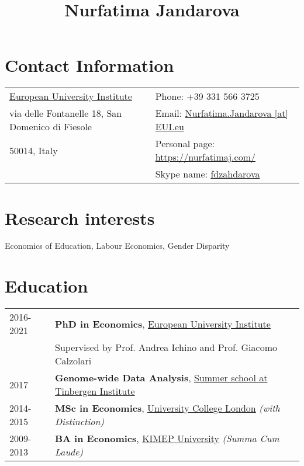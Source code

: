 \documentclass[a4, 11pt]{article}
\title{ {\Huge  Nurfatima Jandarova} }
\date{}
\begin{document}
    \maketitle


    \section*{Contact Information}
    \begin{table}[H]
      \begin{tabular}{ll}\href{https://www.eui.eu/}{European University Institute}&Phone: +39 331 566 3725\\
        via delle Fontanelle 18, San Domenico di Fiesole&
        Email: \href{mailto:Nurfatima.Jandarova [at] EUI.eu}{Nurfatima.Jandarova [at] EUI.eu} \\
        50014, Italy& Personal page: \href{https://nurfatimaj.com/}{https://nurfatimaj.com/} \\
        & Skype name: \href{skype:fdzahdarova?call}{fdzahdarova}
      \end{tabular}
    \end{table}

    \section*{Research interests}Economics of Education, Labour Economics, Gender Disparity

    \section*{Education}\begin{table}[H]
        \begin{tabular}{p{2cm}p{14cm}}
            2016-2021 & \textbf{PhD in Economics}, \href{https://www.eui.eu}{European University Institute}\\ & Supervised by Prof. Andrea Ichino and Prof. Giacomo Calzolari\\
            2017 & \textbf{Genome-wide Data Analysis}, \href{https://www.tinbergen.nl/home}{Summer school at Tinbergen Institute}\\
            2014-2015 & \textbf{MSc in Economics}, \href{https://www.ucl.ac.uk}{University College London}\textit{ (with Distinction) }\\
            2009-2013 & \textbf{BA in Economics}, \href{https://www.kimep.kz/en}{KIMEP University}\textit{ (Summa Cum Laude) }\\
        \end{tabular}
      \end{table}
\end{document}
